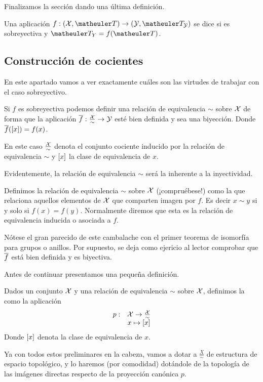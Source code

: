 Finalizamos la sección dando una última definición.
\begin{defi}[Indentificación]
	Una aplicación $f:(\X,\T)\to(\Y,\T_\Y)$ se dice  si es sobreyectiva y $\T_Y=f(\T)$.
\end{defi} 
\subsection{Construcción de cocientes}
En este apartado vamos a ver exactamente cuáles son las virtudes de trabajar con el caso sobreyectivo.

Si $f$ es sobreyectiva podemos definir una relación de equivalencia $\sim$ sobre $\mathcal{X}$ de forma que la aplicación $\overline{f}:\frac{\mathcal{X}}{\sim}\to\mathcal{Y}$ esté bien definida y sea una biyección. Donde $\overline{f}(\left [ x \right ])=f(x)$.

En este caso $\frac{\mathcal{X}}{\sim}$ denota el conjunto cociente inducido por la relación de equivalencia $\sim$ y $\left [ x \right ]$ la clase de equivalencia de $x$.

Evidentemente, la relación de equivalencia $\sim$ será la inherente a la inyectividad.
\begin{defi}
	Definimos la relación de equivalencia $\sim$ sobre $\mathcal{X}$ (¡compruébese!) como la que relaciona aquellos elementos de $\mathcal{X}$ que comparten imagen por $f$. Es decir $x\sim y$ si y solo si $f(x)=f(y)$. Normalmente diremos que esta es la relación de equivalencia inducida o asociada a $f$.
\end{defi}
Nótese el gran parecido de este cambalache con el primer teorema de isomorfía para grupos o anillos. Por supuesto, se deja como ejericio al lector comprobar que $\overline{f}$ está bien definida y es biyectiva.

Antes de continuar presentamos una pequeña definición.
\begin{defi}
	Dados un conjunto $\mathcal{X}$ y una relación de equivalencia $\sim$ sobre $\mathcal{X}$, definimos la  como la aplicación
	\[\begin{array}{cc}
	p:&\mathcal{X}\to\frac{\mathcal{X}}{\sim}\\
	&x\mapsto\left [ x \right ]
	\end{array}\]
	Donde $\left [ x \right ]$ denota la clase de equivalencia de $x$.
\end{defi}
Ya con todos estos preliminares en la cabeza, vamos a dotar a $\frac{X}{\sim}$ de estructura de espacio topológico, y lo haremos (por comodidad) dotándole de la topología de las imágenes directas respecto de la proyección canónica $p$.

